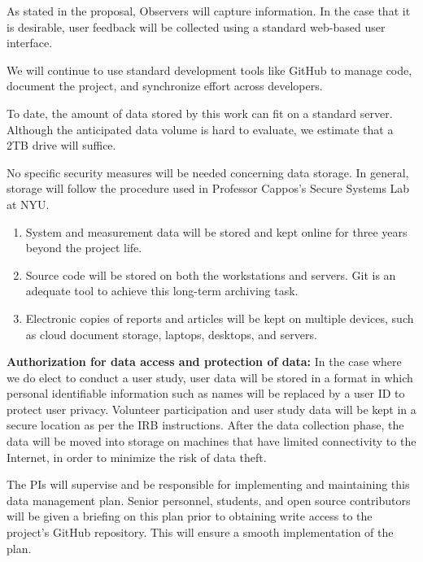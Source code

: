 \vspace{5pt}
As stated in the proposal, Observers will capture information.  In the
case that it is desirable, user feedback will be collected
using a standard web-based user
interface.

We will continue to use standard development tools like GitHub to manage
code, document the project, and synchronize effort across developers.


\vspace{5pt}
To date, the amount of data stored by this work can fit on a standard
server.  Although the anticipated data volume is hard to evaluate, we
estimate that a 2TB drive will suffice.

No specific security measures will be needed
concerning data storage. In general, storage will follow the procedure used in
Professor Cappos's Secure Systems Lab at NYU.

\begin{enumerate}
\item System and measurement data will be stored and kept online for three
years beyond the project life.
\item Source code will be stored on both the workstations and servers. Git
is an adequate tool to achieve this long-term archiving task.
\item Electronic copies of reports and articles will be kept on multiple
devices, such as cloud document storage, laptops, desktops, and servers.
\end{enumerate}

\vspace{5pt}
\noindent \textbf{Authorization for data access and protection of data:}
In the case where we do elect to conduct a user study,
user data will be stored in a format in which personal
identifiable information such as names will be replaced
by a user ID to protect user privacy.
Volunteer participation and user study data will be kept
in a secure location as per the IRB
instructions.
After the data
collection phase, the data will be moved into storage on
machines that have limited connectivity to the Internet, in order to
minimize the risk of data theft.


\vspace{5pt}
The PIs will supervise and be responsible for implementing and maintaining this
data management plan.  Senior personnel, students, and open source contributors
will be given a briefing on this plan prior to obtaining write access to the project's
GitHub repository. This will ensure a smooth implementation of the plan.




















